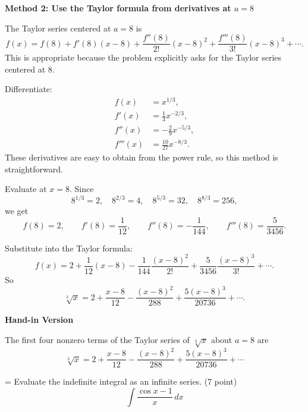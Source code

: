 \documentclass[a4paper,12pt,twocolumn]{article}
\newlength{\problemnumberwidth}
\newenvironment{solutionbox}{\begin{framed}}{\end{framed}}
\newcommand{\problem}[3]{%
  \Needspace{10\baselineskip}%
  \phantomsection\label{#1}%
  \par\vspace{0.8em}%
  \noindent
  \hangindent=\problemnumberwidth
  \hangafter=1
  \makebox[\problemnumberwidth][l]{\textbf{#2.}}#3\par
}
\begin{document}
\begin{solutionbox}
\textbf{Method 2: Use the Taylor formula from derivatives at \(a=8\)}

\begin{steps}
\item The Taylor series centered at \(a=8\) is
\[
f(x)=f(8)+f'(8)(x-8)+\frac{f''(8)}{2!}(x-8)^2+\frac{f'''(8)}{3!}(x-8)^3+\cdots.
\]
This is appropriate because the problem explicitly asks for the Taylor series centered at \(8\).

\item Differentiate:
\[
\begin{aligned}
f(x)&=x^{1/3},\\
f'(x)&=\frac13x^{-2/3},\\
f''(x)&=-\frac29x^{-5/3},\\
f'''(x)&=\frac{10}{27}x^{-8/3}.
\end{aligned}
\]
These derivatives are easy to obtain from the power rule, so this method is straightforward.

\item Evaluate at \(x=8\). Since
\[
8^{1/3}=2,\quad 8^{2/3}=4,\quad 8^{5/3}=32,\quad 8^{8/3}=256,
\]
we get
\[
f(8)=2,
\qquad
f'(8)=\frac{1}{12},
\qquad
f''(8)=-\frac{1}{144},
\qquad
f'''(8)=\frac{5}{3456}.
\]

\item Substitute into the Taylor formula:
\[
f(x)=2+\frac{1}{12}(x-8)-\frac{1}{144}\frac{(x-8)^2}{2!}
+\frac{5}{3456}\frac{(x-8)^3}{3!}+\cdots.
\]
So
\[
\sqrt[3]{x}
=2+\frac{x-8}{12}-\frac{(x-8)^2}{288}+\frac{5(x-8)^3}{20736}+\cdots.
\]
\end{steps}
\end{solutionbox}

\begin{solutionbox}
\textbf{Hand-in Version}

The first four nonzero terms of the Taylor series of \(\sqrt[3]{x}\) about \(a=8\) are
\[
\boxed{
\sqrt[3]{x}
=2+\frac{x-8}{12}-\frac{(x-8)^2}{288}+\frac{5(x-8)^3}{20736}+\cdots
}
\]
\end{solutionbox}

\problem{prob:11-10-2}{2}{Evaluate the indefinite integral as an infinite series. (7 point)
\[
\displaystyle \int \frac{\cos x-1}{x}\,dx
\]}
\end{document}
